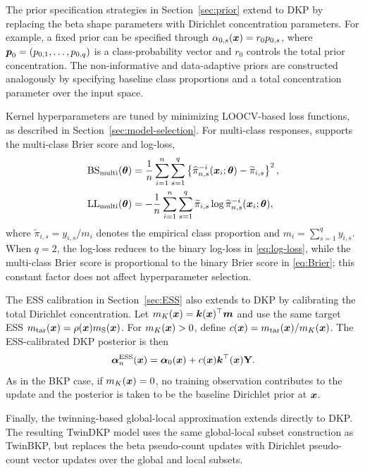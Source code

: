 \documentclass[article, shortnames]{jss}
\renewcommand{\vec}[1]{\mbox{\boldmath ${#1}$}}
\begin{document}
The prior specification strategies in Section~\ref{sec:prior} extend to DKP by replacing the beta shape parameters with Dirichlet concentration parameters. 
For example, a fixed prior can be specified through $\alpha_{0,s}(\vec{x})=r_0p_{0,s}$, where $\vec{p}_0=(p_{0,1},\ldots,p_{0,q})$ is a class-probability vector and $r_0$ controls the total prior concentration. 
The non-informative and data-adaptive priors are constructed analogously by specifying baseline class proportions and a total concentration parameter over the input space.

Kernel hyperparameters are tuned by minimizing LOOCV-based loss functions, as described in Section~\ref{sec:model-selection}. 
For multi-class responses,  supports the multi-class Brier score and log-loss,
\begin{align}
	\mathrm{BS}_{\mathrm{multi}}(\vec{\theta}) 
	&= \frac{1}{n}\sum_{i=1}^n\sum_{s=1}^q
	\left\{\widehat{\pi}_{n,s}^{-i}(\vec{x}_i;\vec{\theta})
	-\widetilde{\pi}_{i,s}\right\}^2, \label{eq:dkp-brier}\\
	\mathrm{LL}_{\mathrm{multi}}(\vec{\theta}) 
	&= -\frac{1}{n}\sum_{i=1}^n\sum_{s=1}^q
	\widetilde{\pi}_{i,s}
	\log \widehat{\pi}_{n,s}^{-i}(\vec{x}_i;\vec{\theta}), \label{eq:dkp-logloss}
\end{align}
where $\widetilde{\pi}_{i,s}=y_{i,s}/m_i$ denotes the empirical class proportion and $m_i=\sum_{s=1}^q y_{i,s}$. 
When $q=2$, the log-loss reduces to the binary log-loss in \eqref{eq:log-loss}, while the multi-class Brier score is proportional to the binary Brier score in \eqref{eq:Brier}; this constant factor does not affect hyperparameter selection.

The ESS calibration in Section~\ref{sec:ESS} also extends to DKP by calibrating the total Dirichlet concentration. 
Let $m_K(\vec{x})=\vec{k}(\vec{x})^\top\vec{m}$ and use the same target ESS $m_{\mathrm{tar}}(\vec{x})=\rho(\vec{x})m_{\mathrm S}(\vec{x})$. 
For $m_K(\vec{x})>0$, define $c(\vec{x})=m_{\mathrm{tar}}(\vec{x})/m_K(\vec{x})$. 
The ESS-calibrated DKP posterior is then
\[
\vec{\alpha}_n^{\mathrm{ESS}}(\vec{x}) 
= \vec{\alpha}_0(\vec{x})
+ c(\vec{x})\vec{k}^\top(\vec{x})\mathbf{Y}.
\]
As in the BKP case, if $m_K(\vec{x})=0$, no training observation contributes to the update and the posterior is taken to be the baseline Dirichlet prior at $\vec{x}$.

Finally, the twinning-based global-local approximation extends directly to DKP. 
The resulting TwinDKP model uses the same global-local subset construction as TwinBKP, but replaces the beta pseudo-count updates with Dirichlet pseudo-count vector updates over the global and local subsets.
\end{document}
